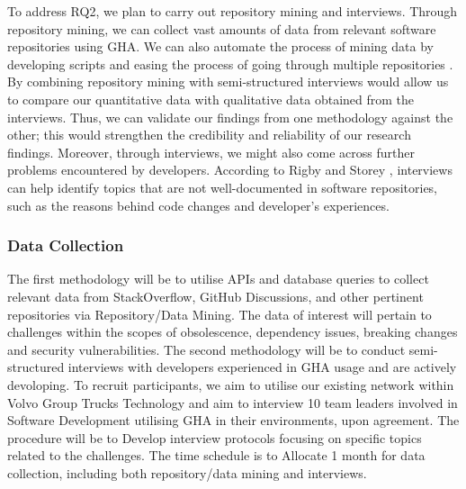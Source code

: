 \documentclass[conference]{IEEEtran}
\begin{document}
       To address RQ2, we plan to carry out repository mining and interviews. Through repository mining, we can collect vast amounts of data from relevant software repositories using GHA. We can also automate the process of mining data by developing scripts and easing the process of going through multiple repositories \cite{chaturvedi2013tools}. By combining repository mining with semi-structured interviews would allow us to compare our quantitative data with qualitative data obtained from the interviews. Thus, we can validate our findings from one methodology against the other; this would strengthen the credibility and reliability of our research findings. Moreover, through interviews, we might also come across further problems encountered by developers. According to Rigby and Storey \cite{rigby2013understanding}, interviews can help identify topics that are not well-documented in software repositories, such as the reasons behind code changes and developer’s experiences.\\

        \subsubsection{\textbf{Data Collection}}
            The first methodology will be to utilise APIs and database queries to collect relevant data from StackOverflow, GitHub Discussions, and other pertinent repositories via Repository/Data Mining. The data of interest will pertain to challenges within the scopes of obsolescence, dependency issues, breaking changes and security vulnerabilities. 
            The second methodology will be to conduct semi-structured interviews with developers experienced in GHA usage and are actively devoloping. To recruit participants, we aim to utilise our existing network within Volvo Group Trucks Technology and aim to interview 10 team leaders involved in Software Development utilising GHA in their environments, upon agreement. The procedure will be to Develop interview protocols focusing on specific topics related to the challenges. The time schedule is to Allocate 1 month for data collection, including both repository/data mining and interviews.\\
\end{document}
